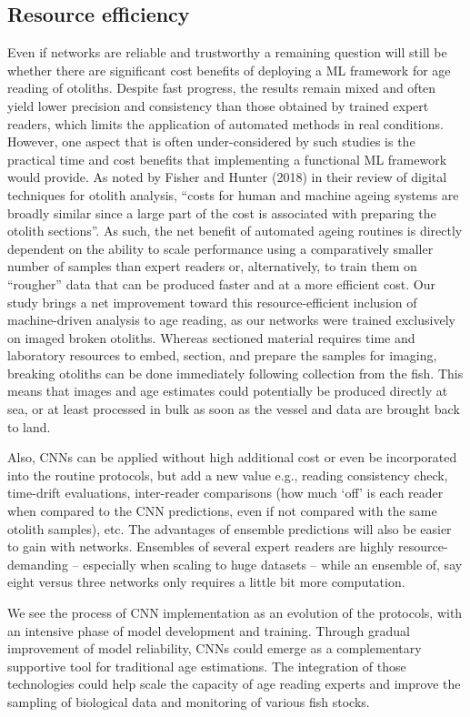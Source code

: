\documentclass[10pt,letterpaper]{article}
\begin{document}
\subsection{Resource efficiency}
Even if networks are reliable and trustworthy a remaining question will still be whether there are significant cost benefits of deploying a ML framework for age reading of otoliths. Despite fast progress, the results remain mixed and often yield lower precision and consistency than those obtained by trained expert readers, which limits the application of automated methods in real conditions. However, one aspect that is often under-considered by such studies is the practical time and cost benefits that implementing a functional ML framework would provide. As noted by Fisher and Hunter (2018)  in their review of digital techniques for otolith analysis, “costs for human and machine ageing systems are broadly similar since a large part of the cost is associated with preparing the otolith sections”. As such, the net benefit of automated ageing routines is directly dependent on the ability to scale performance using a comparatively smaller number of samples than expert readers or, alternatively, to train them on “rougher” data that can be produced faster and at a more efficient cost. Our study brings a net improvement toward this resource-efficient inclusion of machine-driven analysis to age reading, as our networks were trained exclusively on imaged broken otoliths. Whereas sectioned material requires time and laboratory resources to embed, section, and prepare the samples for imaging, breaking otoliths can be done immediately following collection from the fish. This means that images and age estimates could potentially be produced directly at sea, or at least processed in bulk as soon as the vessel and data are brought back to land. 

Also, CNNs can be applied without high additional cost or even be incorporated into the routine protocols, but add a new value e.g., reading consistency check, time-drift evaluations, inter-reader comparisons (how much ‘off’ is each reader when compared to the CNN predictions, even if not compared with the same otolith samples), etc.  The advantages of ensemble predictions will also be easier to gain with networks. Ensembles of several expert readers are highly resource-demanding – especially when scaling to huge datasets – while an ensemble of, say eight versus three networks only requires a little bit more computation.

We see the process of CNN implementation as an evolution of the protocols, with an intensive phase of model development and training. Through gradual improvement of model reliability, CNNs could emerge as a complementary supportive tool for traditional age estimations. The integration of those technologies could help scale the capacity of age reading experts and improve the sampling of biological data and monitoring of various fish stocks.
\end{document}
